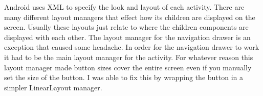 \documentclass[onecolumn, draftclsnofoot,10pt, compsoc]{IEEEtran}
\begin{document}
		Android uses XML to specify the look and layout of each activity.
		There are many different layout managers that effect how its children are displayed on the screen.
		Usually these layouts just relate to where the children components are displayed with each other.
		The layout manager for the navigation drawer is an exception that caused some headache.
		In order for the navigation drawer to work it had to be the main layout manager for the activity.
		For whatever reason this layout manager made button sizes cover the entire screen even if you manually set the size of the button.
		I was able to fix this by wrapping the button in a simpler LinearLayout manager.

%
%
\end{document}
